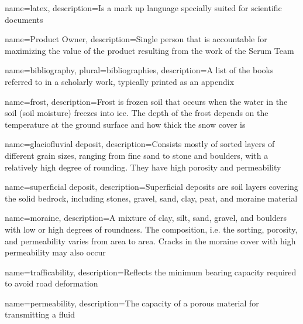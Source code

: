 

\makeglossaries %

{
        name=latex,
        description={Is a mark up language specially suited for
scientific documents}
}

{
        name=Product Owner,
        description={Single person that is accountable for maximizing the value of the product resulting from the work of the Scrum Team \cite{scrum_guide}}
}

{
        name=bibliography,
        plural=bibliographies,
        description={A list of the books referred to in a scholarly work, typically printed as an appendix}
}

{
    name=frost,
    description={Frost is frozen soil that occurs when the water in the soil (soil moisture) freezes into ice. The depth of the frost depends on the temperature at the ground surface and how thick the snow cover is \cite{senorge_terminology}}
}

{
    name=glaciofluvial deposit,
    description={Consists mostly of sorted layers of different grain sizes, ranging from fine sand to stone and boulders, with a relatively high degree of rounding. They have high porosity and permeability \cite{ngu_deposits}}
}

{
    name=superficial deposit,
    description={Superficial deposits are soil layers covering the solid bedrock, including stones, gravel, sand, clay, peat, and moraine material \cite{snl_losmasser}}
}

{
    name=moraine,
    description={A mixture of clay, silt, sand, gravel, and boulders with low or high degrees of roundness. The composition, i.e. the sorting, porosity, and permeability varies from area to area. Cracks in the moraine cover with high permeability may also occur \cite{ngu_deposits}}
}

{
    name=trafficability,
    description={Reflects the minimum bearing capacity required to avoid road deformation \cite{fjeld2023trafficability}}
}

{
    name=permeability,
    description={The capacity of a porous material for transmitting a fluid \cite{britannica_permeability}}
}

